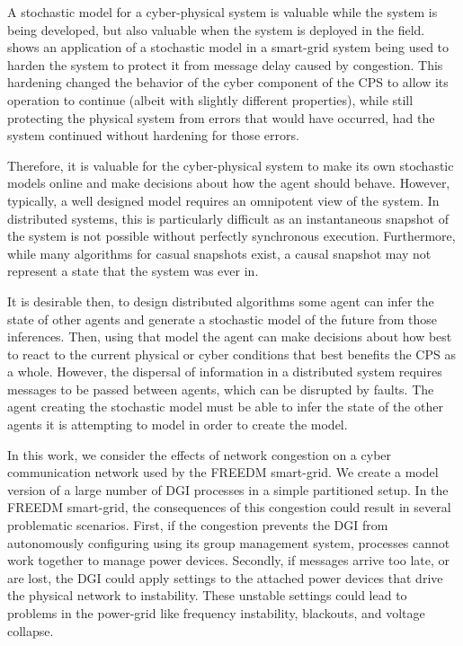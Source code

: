 A stochastic model for a cyber-physical system is valuable while the system is being developed, but also valuable when the system is deployed in the field. \cite{safecomp-jackson} shows an application of a stochastic model in a smart-grid system being used to harden the system to protect it from message delay caused by congestion. This hardening changed the behavior of the cyber component of the \ac{CPS} to allow its operation to continue (albeit with slightly different properties), while still protecting the physical system from errors that would have occurred, had the system continued without hardening for those errors.

Therefore, it is valuable for the cyber-physical system to make its own stochastic models online and make decisions about how the agent should behave. However, typically, a well designed model requires an omnipotent view of the system. In distributed systems, this is particularly difficult as an instantaneous snapshot of the system is not possible without perfectly synchronous execution. Furthermore, while many algorithms for casual snapshots exist\cite{distributed-challenges}, a causal snapshot may not represent a state that the system was ever in.

It is desirable then, to design distributed algorithms some agent can infer the state of other agents and generate a stochastic model of the future from those inferences. Then, using that model the agent can make decisions about how best to react to the current physical or cyber conditions that best benefits the \ac{CPS} as a whole. However, the dispersal of information in a distributed system requires messages to be passed between agents, which can be disrupted by faults\cite{HARINI}. The agent creating the stochastic model must be able to infer the state of the other agents it is attempting to model in order to create the model.

In this work, we consider the effects of network congestion on a cyber communication network used by the \ac{FREEDM} smart-grid.
We create a model version of a large number of \ac{DGI} processes in a simple partitioned setup.
In  the \ac{FREEDM} smart-grid, the consequences of this congestion could result in several problematic scenarios.
First, if the congestion prevents the \ac{DGI} from autonomously configuring using its group management system, processes cannot work together to manage power devices.
Secondly, if messages arrive too late, or are lost, the \ac{DGI} could apply settings to the attached power devices that drive the physical network to instability.
These unstable settings could lead to problems in the power-grid like frequency instability, blackouts, and voltage collapse.

